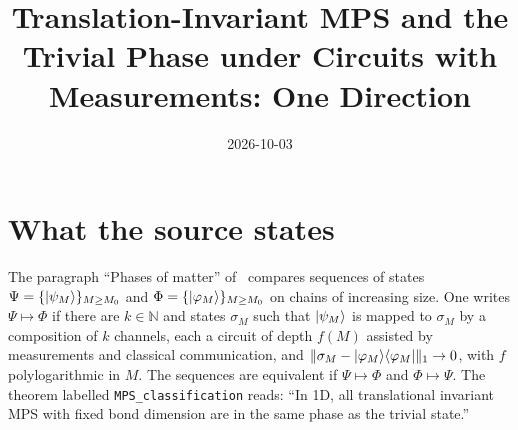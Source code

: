 \documentclass{article}
\title{Translation-Invariant MPS and the Trivial Phase under Circuits with
    Measurements: One Direction}
\author{}
\date{2026-10-03}
\begin{document}
\maketitle
{}

\section{What the source states}
The paragraph ``Phases of matter'' of~\cite{Piroli2021LOCC} compares sequences
of states $\Psi=\{|\psi_M\rangle\}_{M\ge M_0}$ and
$\Phi=\{|\varphi_M\rangle\}_{M\ge M_0}$ on chains of increasing size. One writes
$\Psi\mapsto\Phi$ if there are $k\in\mathbb N$ and states $\sigma_M$ such that
$|\psi_M\rangle$ is mapped to $\sigma_M$ by a composition of $k$ channels, each a
circuit of depth $f(M)$ assisted by measurements and classical communication,
and $\lVert\sigma_M-|\varphi_M\rangle\langle \varphi_M|\rVert_1\to0$, with $f$
polylogarithmic in $M$. The sequences are equivalent if $\Psi\mapsto\Phi$ and
$\Phi\mapsto\Psi$. The theorem labelled \texttt{MPS\_classification} reads: ``In
1D, all translational invariant MPS with fixed bond dimension are in the same
phase as the trivial state.''
\end{document}
